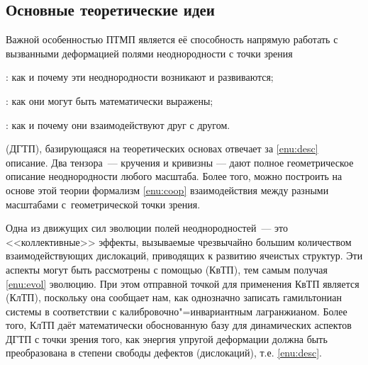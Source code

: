 \documentclass[a4paper, 14pt, titlepage]{extarticle}
\begin{document}
  \subsection{Основные теоретические идеи}

  Важной особенностью ПТМП является её способность напрямую работать с вызванными деформацией полями
  неоднородности с точки зрения
  \begin{enumasbuk}
    \item {}: как и почему эти неоднородности возникают и развиваются; \label{enu:evol}
    \item {}: как они могут быть математически выражены; \label{enu:desc}
    \item {}: как и почему они взаимодействуют друг с другом. \label{enu:coop}
  \end{enumasbuk}

   (ДГТП), базирующаяся на теоретических основах
   отвечает за \ref{enu:desc} описание. Два тензора~--- кручения и
  кривизны --- дают полное геометрическое описание неоднородности любого масштаба. Более того, можно
  построить на основе этой теории формализм \ref{enu:coop} взаимодействия между разными масштабами
  с~геометрической точки зрения.

  Одна из движущих сил эволюции полей неоднородностей~--- это <<коллективные>> эффекты, вызываемые
  чрезвычайно большим количеством взаимодействующих дислокаций, приводящих к развитию ячеистых
  структур. Эти аспекты могут быть рассмотрены с помощью  (КвТП), тем
  самым получая \ref{enu:evol} эволюцию. При этом отправной точкой для применения КвТП является
   (КлТП), поскольку она сообщает нам, как однозначно записать
  гамильтониан системы в соответствии с калибровочно"=инвариантным лагранжианом. Более того, КлТП
  даёт математически обоснованную базу для динамических аспектов ДГТП с точки зрения того, как
  энергия упругой деформации должна быть преобразована в степени свободы дефектов (дислокаций), т.е. \ref{enu:desc}.
\end{document}
